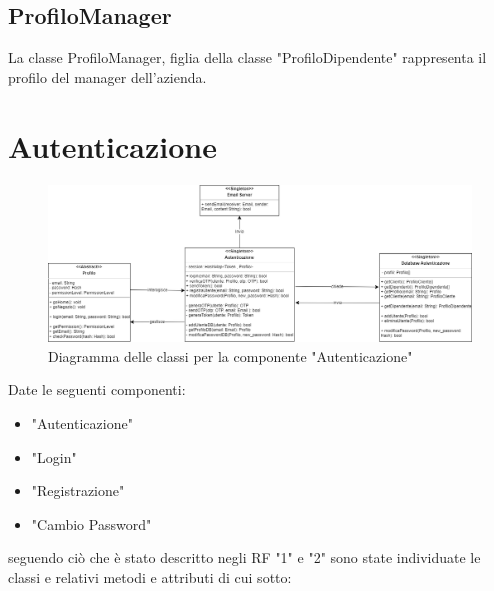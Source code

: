 \documentclass{report}
\begin{document}
\subsection*{ProfiloManager}
La classe ProfiloManager, figlia della classe "ProfiloDipendente" rappresenta il profilo del manager dell'azienda.



\section{Autenticazione}

\begin{figure}[H]
	\centering\includegraphics[width=1\textwidth]{images/Diagramma_delle_classi_Autenticazione.png}
	Diagramma delle classi per la componente "Autenticazione" 
\end{figure}

Date le seguenti componenti: 
\begin{itemize}
	\item "Autenticazione"
	\item "Login"
	\item "Registrazione"
	\item "Cambio Password"
\end{itemize}
seguendo ciò che è stato descritto negli RF "1" e "2" sono state individuate le classi e relativi metodi e attributi di cui sotto:
\end{document}
